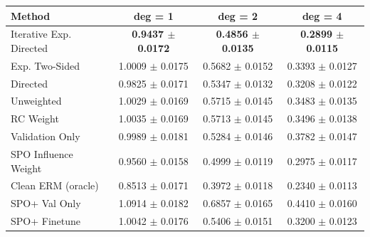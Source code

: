 \begin{tabular}{lccc}
\toprule
Method & deg = 1 & deg = 2 & deg = 4 \\
\midrule
Iterative Exp. Directed & \textbf{0.9437 $\pm$ 0.0172} & \textbf{0.4856 $\pm$ 0.0135} & \textbf{0.2899 $\pm$ 0.0115} \\
Exp. Two-Sided & 1.0009 $\pm$ 0.0175 & 0.5682 $\pm$ 0.0152 & 0.3393 $\pm$ 0.0127 \\
Directed & 0.9825 $\pm$ 0.0171 & 0.5347 $\pm$ 0.0132 & 0.3208 $\pm$ 0.0122 \\
Unweighted & 1.0029 $\pm$ 0.0169 & 0.5715 $\pm$ 0.0145 & 0.3483 $\pm$ 0.0135 \\
RC Weight & 1.0035 $\pm$ 0.0169 & 0.5713 $\pm$ 0.0145 & 0.3496 $\pm$ 0.0138 \\
Validation Only & 0.9989 $\pm$ 0.0181 & 0.5284 $\pm$ 0.0146 & 0.3782 $\pm$ 0.0147 \\
SPO Influence Weight & 0.9560 $\pm$ 0.0158 & 0.4999 $\pm$ 0.0119 & 0.2975 $\pm$ 0.0117 \\
Clean ERM (oracle) & 0.8513 $\pm$ 0.0171 & 0.3972 $\pm$ 0.0118 & 0.2340 $\pm$ 0.0113 \\
SPO+ Val Only & 1.0914 $\pm$ 0.0182 & 0.6857 $\pm$ 0.0165 & 0.4410 $\pm$ 0.0160 \\
SPO+ Finetune & 1.0042 $\pm$ 0.0176 & 0.5406 $\pm$ 0.0151 & 0.3200 $\pm$ 0.0123 \\
\bottomrule
\end{tabular}
